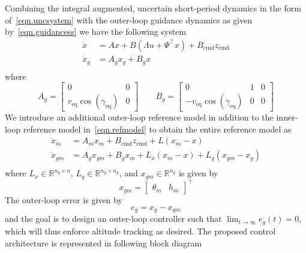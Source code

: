 \documentclass[]{../sty/aiaa-tc}
\theoremstyle{examplestyle}
\begin{document}
  Combining the integral augmented, uncertain short-period dynamics in the form of\ \eqref{eqn.uncsystem} with the outer-loop guidance dynamics as given by\ \eqref{eqn.guidancess} we have the following system
  \begin{equation}
    \label{eqn.plantouter}
    \begin{split}
      \dot{x} &= Ax + B(\Lambda u+\Psi^{\top}x) + B_{\text{cmd}}z_{\text{cmd}} \\
      \dot{x}_{g} &= A_{g}x_{g} + B_{g}x \\
    \end{split}
  \end{equation}
  where
  \begin{equation*}
    A_{g} =
    \begin{bmatrix}
      0 & 0 \\
      v_{\text{eq}}\cos(\gamma_{\text{eq}}) & 0
    \end{bmatrix}
    \qquad
    B_{g} =
    \begin{bmatrix}
      0 & 1 & 0 \\
    -v_{\text{eq}}\cos(\gamma_{\text{eq}}) & 0 & 0
    \end{bmatrix}
  \end{equation*}
  We introduce an additional outer-loop reference model in addition to the inner-loop reference model in\ \eqref{eqn.refmodel} to obtain the entire reference model as
  \begin{equation}
    \label{eqn.refmodelouter}
    \begin{split}
      \dot{x}_{m} &= A_{m}x_{m} + B_{\text{cmd}}z_{\text{cmd}} + L(x_{m}-x) \\
      \dot{x}_{gm} &= A_{g}x_{gm} + B_{g}x_{m} + L_{x}(x_{m}-x) + L_{g}(x_{gm}-x_{g}) \\
    \end{split}
  \end{equation}
  where $L_{x}\in\mathbb{R}^{n_{g}\times n}$, $L_{g}\in\mathbb{R}^{n_{g}\times n_{g}}$, and $x_{gm}\in\mathbb{R}^{n_{g}}$ is given by
  \begin{equation*}
    x_{gm} =
    \begin{bmatrix}
      \theta_{m} &
      h_{m}
    \end{bmatrix}^{\top}
  \end{equation*}
  The outer-loop error is given by
  \begin{equation*}
    e_{g} = x_{g} - x_{gm}
  \end{equation*}
  and the goal is to design an outer-loop controller such that $\lim_{t\rightarrow\infty}e_{g}(t)=0$, which will thus enforce altitude tracking as desired.
  The proposed control architecture is represented in following block diagram
\end{document}

